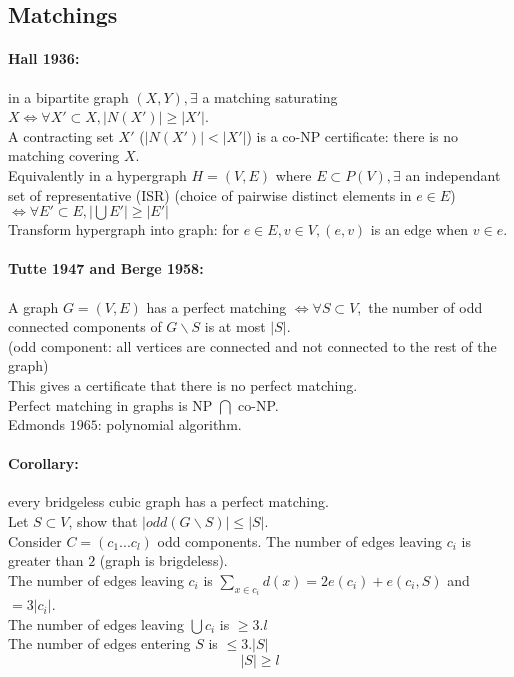 \documentclass[12pt]{article}
\begin{document}
\subsection{Matchings}
\paragraph{Hall 1936:} in a bipartite graph $(X,Y), \exists$ a matching saturating $X \Leftrightarrow \forall X' \subset X, |N(X')| \geqslant |X'|$.\\
A contracting set $X'$ ($|N(X')| < |X'|$) is a co-NP certificate: there is no matching covering $X$.\\
Equivalently in a hypergraph $H=(V,E)$ where $E \subset P(V), \exists$ an independant set of representative (ISR) (choice of pairwise distinct elements in $e \in E$) $\Leftrightarrow \forall E' \subset E, |\bigcup E'| \geqslant |E'|$\\
Transform hypergraph into graph: for $e \in E, v \in V, (e,v)$ is an edge when $v \in e$.\\

\paragraph{Tutte 1947 and Berge 1958:\\}
A graph $G=(V,E)$ has a perfect matching $\Leftrightarrow \forall S \subset V,$ the number of odd connected components of $G \backslash S$ is at most $|S|$.\\
(odd component: all vertices are connected and not connected to the rest of the graph)\\
This gives a certificate that there is no perfect matching.\\
Perfect matching in graphs is NP $\bigcap$ co-NP.\\
Edmonds $1965$: polynomial algorithm.

\paragraph{Corollary:} every bridgeless cubic graph has a perfect matching.\\
Let $S \subset V$, show that $|odd(G \backslash S)| \leqslant |S|$.\\
Consider $C = (c_1 ... c_l)$ odd components. The number of edges leaving $c_i$ is greater than $2$ (graph is brigdeless).\\
The number of edges leaving $c_i$ is $\sum\limits_{x \in c_i} d(x) = 2 e(c_i) + e(c_i, S)$ and $= 3 |c_i|$.\\
The number of edges leaving $\bigcup c_i$ is $\geqslant 3.l$\\
The number of edges entering $S$ is $\leqslant 3.|S|$\\
\[|S| \geqslant l\]
\end{document}
